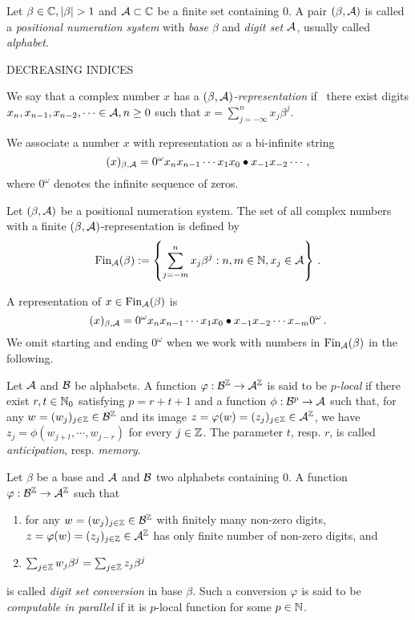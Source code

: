 
\begin{defn}
  Let $\beta \in \CC, |\beta|>1$ and $\mathcal{A} \subset \mathbb{C}$ be a finite set containing 0. A pair $(\beta, \mathcal{A})$ is called a \emph{positional numeration system} with \emph{base} $\beta$ and \emph{digit set} $\mathcal{A}$, usually called \emph{alphabet}.
\end{defn}
DECREASING INDICES

\begin{defn}
  We say that a complex number $x$ has a \emph{$(\beta, \mathcal{A})$-representation} if~ there exist digits $x_n,x_{n-1}, x_{n-2},\dots \in\mathcal{A}, n\geq 0$ such that $x=\sum_{j=-\infty}^n x_j \beta^j$.
\end{defn}
We associate a number $x$ with representation as a bi-infinite string 
  $$
    (x)_{\beta,\mathcal{A}}=0^\omega x_n x_{n-1}\cdots x_1 x_0 \bullet x_{-1} x_{-2} \cdots\,,
  $$
  where $0^\omega$ denotes the infinite sequence of zeros.

\begin{defn}
Let $(\beta, \mathcal{A})$ be a positional numeration system. The set of all complex numbers with a finite $(\beta, \mathcal{A})$-representation is defined by
$$
    \text{Fin}_{\mathcal{A}}(\beta):=\left\{\sum_{j=-m}^n x_j \beta^j : n, m \in \mathbb{N}, x_j \in \mathcal{A} \right\}\,.
$$
\end{defn}
A representation of $x\in\text{Fin}_{\mathcal{A}}(\beta)$ is 
$$
(x)_{\beta,\mathcal{A}}= 0^\omega x_n x_{n-1}\cdots x_1 x_0 \bullet x_{-1} x_{-2} \cdots x_{-m} 0^\omega\,.
$$ 
We omit starting and ending $0^\omega$ when we work with numbers in $\text{Fin}_{\mathcal{A}}(\beta)$ in the following.
\begin{defn}
Let $\mathcal{A}$ and $\mathcal{B}$ be alphabets. A function $\varphi:\mathcal{B}^{\mathbb{Z}} \rightarrow \mathcal{A}^{\mathbb{Z}}$ is said to be \emph{$p$-local} if there exist $r,t\in\mathbb{N}_0$ satisfying $p=r+t+1$ and a function $\phi: \mathcal{B}^p \rightarrow \mathcal{A}$ such that, for any $w=(w_j)_{j\in\mathbb{Z}}\in\mathcal{B}^{\mathbb{Z}}$ and its image $z=\varphi(w)=(z_j)_{j\in\mathbb{Z}}\in\mathcal{A}^{\mathbb{Z}}$, we have $z_j=\phi(w_{j+t},\cdots,w_{j-r})$ for every $j\in\mathbb{Z}$. The parameter $t$, resp. $r$, is called \emph{anticipation}, resp. \emph{memory}.
\end{defn}
  
\begin{defn}
Let $\beta$ be a base and $\mathcal{A}$ and $\mathcal{B}$ two alphabets containing 0. A function $\varphi:\mathcal{B}^{\mathbb{Z}}\rightarrow \mathcal{A}^{\mathbb{Z}}$ such that
  \begin{enumerate}
      \item for any $w=(w_j)_{j\in\mathbb{Z}}\in\mathcal{B}^{\mathbb{Z}}$ with finitely many non-zero digits, $z=\varphi(w)=(z_j)_{j\in\mathbb{Z}}\in\mathcal{A}^{\mathbb{Z}}$ has only finite number of non-zero digits, and
      \item $\sum_{j\in\mathbb{Z}} w_j \beta^j= \sum_{j\in\mathbb{Z}} z_j \beta^j$
  \end{enumerate}
  is called \emph{digit set conversion} in base $\beta$. Such a conversion $\varphi$ is said to be \emph{computable in parallel} if it is $p$-local function for some $p\in\mathbb{N}$. 
\end{defn}





